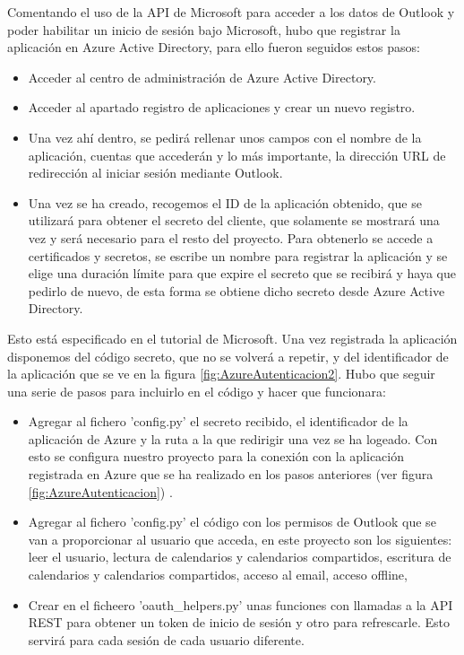 Comentando el uso de la API de Microsoft para acceder a los datos de Outlook y poder habilitar un inicio de sesión bajo Microsoft, hubo que registrar la aplicación en Azure Active Directory, para ello fueron seguidos estos pasos:
\begin{itemize}
    \item Acceder al centro de administración de Azure Active Directory.
    \item Acceder al apartado registro de aplicaciones y crear un nuevo registro.
    \item Una vez ahí dentro, se pedirá rellenar unos campos con el nombre de la aplicación, cuentas que accederán y lo más importante, la dirección URL de redirección al iniciar sesión mediante Outlook.\newline
    \item Una vez se ha creado, recogemos el ID de la aplicación obtenido, que se utilizará para obtener el secreto del cliente, que solamente se mostrará una vez y será necesario para el resto del proyecto. Para obtenerlo se accede a certificados y secretos, se escribe un nombre para registrar la aplicación y se elige una duración límite para que expire el secreto que se recibirá y haya que pedirlo de nuevo, de esta forma se obtiene dicho secreto desde Azure Active Directory.
\end{itemize}
Esto está especificado en el tutorial de Microsoft\cite{pythonMicrosoftGraph}. \newline
Una vez registrada la aplicación disponemos del código secreto, que no se volverá a repetir, y del identificador de la aplicación que se ve en la figura \ref{fig:AzureAutenticacion2}. Hubo que seguir una serie de pasos para incluirlo en el código y hacer que funcionara:
\begin{itemize}
    \item Agregar al fichero 'config.py' el secreto recibido, el identificador de la aplicación de Azure y la ruta a la que redirigir una vez se ha logeado. Con esto se configura nuestro proyecto para la conexión con la aplicación registrada en Azure que se ha realizado en los pasos anteriores (ver figura \ref{fig:AzureAutenticacion}) .
    \item Agregar al fichero 'config.py' el código con los permisos de Outlook que se van a proporcionar al usuario que acceda, en este proyecto son los siguientes: leer el usuario, lectura de calendarios y calendarios compartidos, escritura de calendarios y calendarios compartidos, acceso al email, acceso offline,
    \item Crear en el ficheero 'oauth\_helpers.py' unas funciones con llamadas a la API REST para obtener un token de inicio de sesión y otro para refrescarle. Esto servirá para cada sesión de cada usuario diferente.
\end{itemize}
